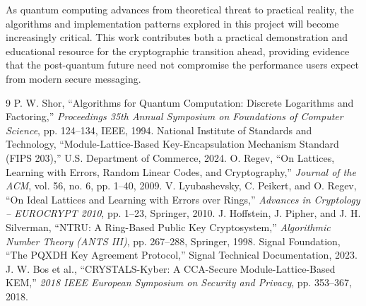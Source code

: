 \documentclass[11pt,a4paper]{article}
\begin{document}
As quantum computing advances from theoretical threat to practical reality, the algorithms and implementation patterns explored in this project will become increasingly critical. This work contributes both a practical demonstration and educational resource for the cryptographic transition ahead, providing evidence that the post-quantum future need not compromise the performance users expect from modern secure messaging.

\begin{thebibliography}{9}
 P. W. Shor, ``Algorithms for Quantum Computation: Discrete Logarithms and Factoring,'' \textit{Proceedings 35th Annual Symposium on Foundations of Computer Science}, pp. 124--134, IEEE, 1994.
 National Institute of Standards and Technology, ``Module-Lattice-Based Key-Encapsulation Mechanism Standard (FIPS 203),'' U.S. Department of Commerce, 2024.
 O. Regev, ``On Lattices, Learning with Errors, Random Linear Codes, and Cryptography,'' \textit{Journal of the ACM}, vol. 56, no. 6, pp. 1--40, 2009.
 V. Lyubashevsky, C. Peikert, and O. Regev, ``On Ideal Lattices and Learning with Errors over Rings,'' \textit{Advances in Cryptology -- EUROCRYPT 2010}, pp. 1--23, Springer, 2010.
 J. Hoffstein, J. Pipher, and J. H. Silverman, ``NTRU: A Ring-Based Public Key Cryptosystem,'' \textit{Algorithmic Number Theory (ANTS III)}, pp. 267--288, Springer, 1998.
 Signal Foundation, ``The PQXDH Key Agreement Protocol,'' Signal Technical Documentation, 2023.
 J. W. Bos et al., ``CRYSTALS-Kyber: A CCA-Secure Module-Lattice-Based KEM,'' \textit{2018 IEEE European Symposium on Security and Privacy}, pp. 353--367, 2018.
\end{thebibliography}
\end{document}
